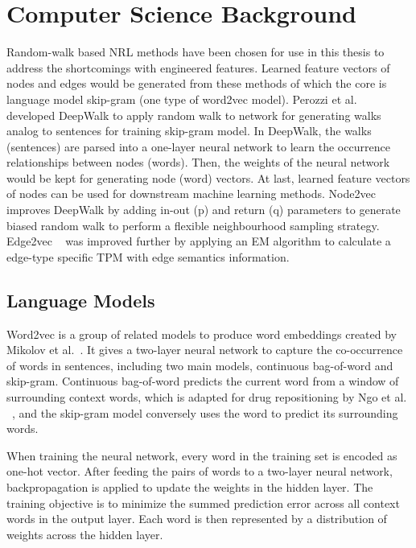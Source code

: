 \chapter{Computer Science Background}
\label{ch:computerscience}

Random-walk based \ac{NRL} methods have been chosen for use in this thesis to address the shortcomings with engineered features. Learned feature vectors of nodes and edges would be generated from these methods of which the core is language model skip-gram (one type of word2vec model). Perozzi et al. ~\cite{perozzi_deepwalk:_2014} developed DeepWalk to apply random walk to network for generating walks analog to sentences for training skip-gram model. In DeepWalk, the walks (sentences) are parsed into a one-layer neural network to learn the occurrence relationships between nodes (words). Then, the weights of the neural network would be kept for generating node (word) vectors. At last, learned feature vectors of nodes can be used for downstream machine learning methods. Node2vec ~\cite{grover_node2vec:_2016} improves DeepWalk by adding in-out (p) and return (q) parameters to generate biased random walk to perform a flexible neighbourhood sampling strategy. Edge2vec ~\cite{gao_edge2vec:_2018} was improved further by applying an \ac{EM} algorithm to calculate a edge-type specific \ac{TPM} with edge semantics information. 

\section{Language Models}

Word2vec is a group of related models to produce word embeddings created by Mikolov et al.~\cite{mikolov_efficient_2013}. It gives a two-layer neural network to capture the co-occurrence of words in sentences, including two main models, continuous bag-of-word and skip-gram. Continuous bag-of-word predicts the current word from a window of surrounding context words, which is adapted for drug repositioning by Ngo et al. ~\cite{ngo_application_2016}, and the skip-gram model conversely uses the word to predict its surrounding words.

When training the neural network, every word in the training set is encoded as one-hot vector. After feeding the pairs of words to a two-layer neural network, backpropagation is applied to update the weights in the hidden layer. The training objective is to minimize the summed prediction error across all context words in the output layer. Each word is then represented by a distribution of weights across the hidden layer.

